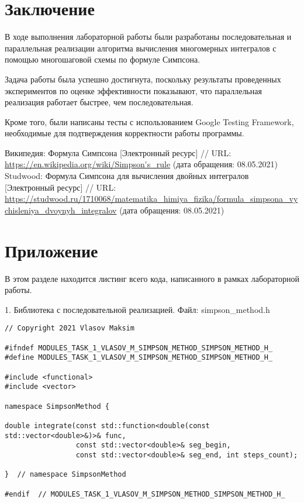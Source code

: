\documentclass{report}
\begin{document}
\section*{Заключение}
В ходе выполнения лабораторной работы были разработаны последовательная и параллельная реализации алгоритма вычисления многомерных интегралов с помощью многошаговой схемы по формуле Симпсона.
\par Задача работы была успешно достигнута, поскольку результаты проведенных экспериментов по оценке эффективности показывают, что параллельная реализация работает быстрее, чем последовательная.
\par Кроме того, были написаны тесты с использованием Google Testing Framework, необходимые для подтверждения корректности работы программы.
\newpage

\begin{thebibliography}{1}
 Википедия: Формула Симпсона [Электронный ресурс] // URL: \url {https://en.wikipedia.org/wiki/Simpson's_rule} (дата обращения: 08.05.2021)
 Studwood: Формула Симпсона для вычисления двойных интегралов [Электронный ресурс] // URL: \url {https://studwood.ru/1710068/matematika_himiya_fizika/formula_simpsona_vychisleniya_dvoynyh_integralov} (дата обращения: 08.05.2021)
\end{thebibliography}
\newpage

\section*{Приложение}
В этом разделе находится листинг всего кода, написанного в рамках лабораторной работы.
\par 1. Библиотека с последовательной реализацией. Файл: simpson\_method.h
\begin{lstlisting}
// Copyright 2021 Vlasov Maksim

#ifndef MODULES_TASK_1_VLASOV_M_SIMPSON_METHOD_SIMPSON_METHOD_H_
#define MODULES_TASK_1_VLASOV_M_SIMPSON_METHOD_SIMPSON_METHOD_H_

#include <functional>
#include <vector>

namespace SimpsonMethod {

double integrate(const std::function<double(const std::vector<double>&)>& func,
                 const std::vector<double>& seg_begin,
                 const std::vector<double>& seg_end, int steps_count);

}  // namespace SimpsonMethod

#endif  // MODULES_TASK_1_VLASOV_M_SIMPSON_METHOD_SIMPSON_METHOD_H_
\end{lstlisting}
\end{document}
